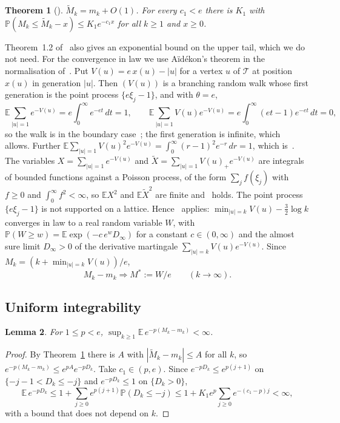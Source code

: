 \documentclass[11pt]{amsart}
\newtheorem{theorem}{Theorem}[section]
\newtheorem{lemma}[theorem]{Lemma}
\theoremstyle{definition}
\theoremstyle{remark}
\numberwithin{equation}{section}
\newcommand{\PP}{\mathbb P}
\newcommand{\E}{\mathbb E}
\newcommand{\cT}{\mathcal T}
\begin{document}
\begin{theorem}[{\cite[Theorems~1.1 and~1.2]{ABF}}]\label{thm:ABF}
$\widetilde M_k=m_k+O(1)$. For every $c_1<e$ there is $K_1$ with $\PP(M_k\le\widetilde M_k-x)\le K_1e^{-c_1x}$ for all $k\ge1$ and $x\ge0$.
\end{theorem}

Theorem~1.2 of~\cite{ABF} also gives an exponential bound on the upper tail, which we do not need. For the convergence in law we use A\"id\'ekon's theorem in the normalisation of~\cite{Aid}. Put $V(u)=e\,x(u)-|u|$ for a vertex $u$ of $\cT$ at position $x(u)$ in generation $|u|$. Then $(V(u))$ is a branching random walk whose first generation is the point process $\{e\xi_j-1\}$, and with $\theta=e$,
\[
\E\sum_{|u|=1}e^{-V(u)}=e\int_0^\infty e^{-et}\,dt=1,\qquad \E\sum_{|u|=1}V(u)e^{-V(u)}=e\int_0^\infty(et-1)e^{-et}\,dt=0,
\]
so the walk is in the boundary case~\cite[(1.1)]{Aid}; the first generation is infinite, which~\cite{Aid} allows. Further $\E\sum_{|u|=1}V(u)^2e^{-V(u)}=\int_0^\infty(r-1)^2e^{-r}\,dr=1$, which is~\cite[(1.3)]{Aid}. The variables $X=\sum_{|u|=1}e^{-V(u)}$ and $\widetilde X=\sum_{|u|=1}V(u)_+e^{-V(u)}$ are integrals of bounded functions against a Poisson process, of the form $\sum_j f(\xi_j)$ with $f\ge0$ and $\int_0^\infty f^2<\infty$, so $\E X^2$ and $\E\widetilde X^2$ are finite and~\cite[(1.4)]{Aid} holds. The point process $\{e\xi_j-1\}$ is not supported on a lattice. Hence~\cite[Theorem~1.1]{Aid} applies: $\min_{|u|=k}V(u)-\tfrac32\log k$ converges in law to a real random variable $W$, with $\PP(W\ge w)=\E\exp(-c\,e^wD_\infty)$ for a constant $c\in(0,\infty)$ and the almost sure limit $D_\infty>0$ of the derivative martingale $\sum_{|u|=k}V(u)e^{-V(u)}$. Since $M_k=(k+\min_{|u|=k}V(u))/e$,
\begin{equation}\label{eq:law}
M_k-m_k\Rightarrow M^*:=W/e\qquad(k\to\infty).
\end{equation}

\subsection{Uniform integrability}
\begin{lemma}\label{lem:ui}
For $1\le p<e$, $\sup_{k\ge1}\E\,e^{-p(M_k-m_k)}<\infty$.
\end{lemma}

\begin{proof}
By Theorem~\ref{thm:ABF} there is $A$ with $|\widetilde M_k-m_k|\le A$ for all $k$, so $e^{-p(M_k-m_k)}\le e^{pA}e^{-pD_k}$. Take $c_1\in(p,e)$. Since $e^{-pD_k}\le e^{p(j+1)}$ on $\{-j-1<D_k\le-j\}$ and $e^{-pD_k}\le1$ on $\{D_k>0\}$,
\[
\E\,e^{-pD_k}\le1+\sum_{j\ge0}e^{p(j+1)}\PP(D_k\le-j)\le1+K_1e^{p}\sum_{j\ge0}e^{-(c_1-p)j}<\infty,
\]
with a bound that does not depend on $k$.
\end{proof}
\end{document}
